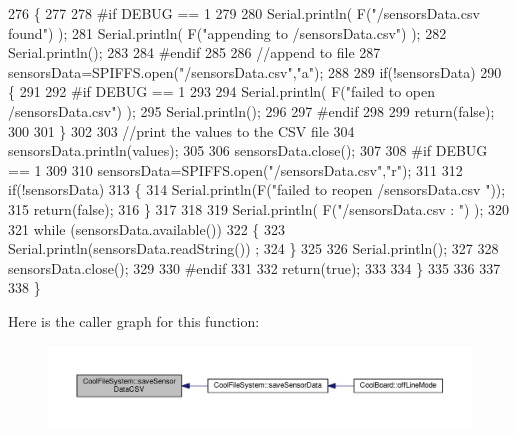 \begin{DoxyCode}
276     \{
277 
278 \textcolor{preprocessor}{    #if DEBUG == 1}
279     
280         Serial.println( F(\textcolor{stringliteral}{"/sensorsData.csv  found"}) );
281         Serial.println( F(\textcolor{stringliteral}{"appending to /sensorsData.csv"}) );
282         Serial.println();
283     
284 \textcolor{preprocessor}{    #endif}
285 
286         \textcolor{comment}{//append to file}
287         sensorsData=SPIFFS.open(\textcolor{stringliteral}{"/sensorsData.csv"},\textcolor{stringliteral}{"a"});
288         
289         \textcolor{keywordflow}{if}(!sensorsData)
290         \{
291         
292 \textcolor{preprocessor}{        #if DEBUG == 1}
293             
294             Serial.println( F(\textcolor{stringliteral}{"failed to open /sensorsData.csv"}) );
295             Serial.println();
296 
297 \textcolor{preprocessor}{        #endif}
298             
299             \textcolor{keywordflow}{return}(\textcolor{keyword}{false});
300         
301         \}
302 
303         \textcolor{comment}{//print the values to the CSV file}
304         sensorsData.println(values);
305         
306         sensorsData.close();
307 
308 \textcolor{preprocessor}{    #if DEBUG == 1}
309 
310         sensorsData=SPIFFS.open(\textcolor{stringliteral}{"/sensorsData.csv"},\textcolor{stringliteral}{"r"});
311         
312         \textcolor{keywordflow}{if}(!sensorsData)
313         \{
314             Serial.println(F(\textcolor{stringliteral}{"failed to reopen /sensorsData.csv "}));
315             \textcolor{keywordflow}{return}(\textcolor{keyword}{false});      
316         \}
317 
318         
319         Serial.println( F(\textcolor{stringliteral}{"/sensorsData.csv : "}) );
320 
321         \textcolor{keywordflow}{while} (sensorsData.available()) 
322         \{
323             Serial.println(sensorsData.readString()) ;
324         \}
325         
326         Serial.println();
327         
328         sensorsData.close();
329         
330 \textcolor{preprocessor}{    #endif      }
331         
332         \textcolor{keywordflow}{return}(\textcolor{keyword}{true});
333     
334     \}   
335 
336 
337 
338 \}
\end{DoxyCode}
Here is the caller graph for this function\+:
\nopagebreak
\begin{figure}[H]
\begin{center}
\leavevmode
\includegraphics[width=350pt]{classCoolFileSystem_af5a51e2b9bb6e7e7edf75a508fe75f82_icgraph}
\end{center}
\end{figure}
\mbox{\label{classCoolFileSystem_a32dad79ae80182a83e2e8f52286b7c7b}} 
